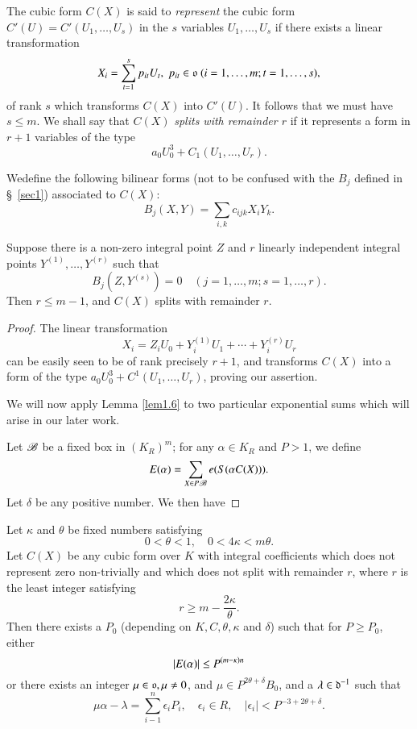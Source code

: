 The cubic form $C(X)$ is said to \textit{represent} the cubic form\break 
$C'(U)=C'(U_1,\ldots,U_s)$ in the $s$ variables $U_1,\ldots, U_s$ if 
there exists a linear transformation 
$$
X_i=\sum\limits_{t=1}^sp_{it}U_t,\; p_{it}\in 
\mathfrak{o}\;(i=1,\ldots,m;t=1,\ldots,s),
$$
of rank $s$ which transforms $C(X)$ into $C'(U)$. It follows that we 
must have $s\leq m$. We shall say that $C(X)$ \textit{splits with remainder 
$r$} if it represents a form in $r+1$ variables of the type
$$
a_0U_0^3+C_1(U_1,\ldots,U_r).
$$

We\pageoriginale define the following bilinear forms (not to be 
confused with the $B_j$ defined in \S~\ref{sec1}) associated to $C(X)$:
$$
B_j(X,Y)=\sum\limits_{i,k}c_{ijk}X_iY_k.
$$

\begin{lemma}\label{lem2.1}
Suppose there is a non-zero integral point $Z$ and $r$ linearly 
independent integral points $Y^{(1)},\ldots,Y^{(r)}$ such that 
$$
B_j(Z,Y^{(s)})=0\quad (j=1,\ldots,m;s=1,\ldots,r).
$$
Then $r\leq m-1$, and $C(X)$ splits with remainder $r$.
\end{lemma}

\begin{proof}
The linear transformation
$$
X_i=Z_iU_0+Y_i^{(1)}U_1+\cdots+Y_i^{(r)}U_r
$$
can be easily seen to be of rank precisely $r+1$, and transforms 
$C(X)$ into a form of the type $a_0U_0^3+C^1(U_1,\ldots,U_r)$, proving 
our assertion. 

We will now apply Lemma \ref{lem1.6} to two particular exponential 
sums which will arise in our later work.

Let $\mathscr{B}$ be a fixed box in $(K_R)^m$; for any $\alpha\in K_R$ and 
$P>1$, we define 
$$
E(\alpha)=\sum\limits_{X\in P\mathscr{B}}e(S(\alpha C(X))).
$$ 
Let $\delta$ be any positive number. We then have 
\end{proof}

\begin{lemma}\label{lem2.2}
Let $\kappa$ and $\theta$ be fixed numbers satisfying
$$
0<\theta <1,\quad 0<4\kappa <m\theta.
$$
Let $C(X)$ be any cubic form over $K$ with integral coefficients which 
does not represent zero non-trivially and which does not split with 
remainder $r$, where $r$ is the least integer satisfying 
$$
r\geq m-\frac{2\kappa}{\theta}.
$$
Then there exists a $P_0$ (depending on $K,C,\theta,\kappa$ and 
$\delta$) such that for $P\geq P_0$, either 
\begin{equation}\label{eq4}
\left|{E(\alpha)}\right|\leq P^{(m-\kappa)n}
\end{equation}
or there exists an integer $\mu\in\mathfrak{o},\mu\neq 0$, and $\mu\in 
P^{2\theta+\delta}B_0$, and a $\lambda\in\mathfrak{d}^{-1}$ such that
\begin{equation}\label{eq5}
\mu\alpha-\lambda=\sum\limits_{i-1}^n\epsilon_iP_i,\quad \epsilon_i\in 
R,\quad |\epsilon_i|<P^{-3+2\theta+\delta}.
\end{equation}
\end{lemma}

